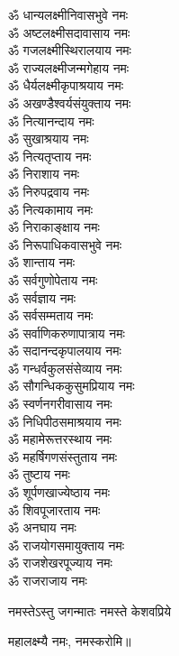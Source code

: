 \begin{multicols}{2}
\begin{flushleft}
ॐ धान्यलक्ष्मीनिवासभुवे नमः\\
ॐ अष्टलक्ष्मीसदावासाय नमः\\
ॐ गजलक्ष्मीस्थिरालयाय नमः\\
ॐ राज्यलक्ष्मीजन्मगेहाय नमः\hfill{}\\ %
ॐ धैर्यलक्ष्मीकृपाश्रयाय नमः\\
ॐ अखण्डैश्वर्यसंयुक्ताय नमः\\
ॐ नित्यानन्दाय नमः\\
ॐ सुखाश्रयाय नमः\\
ॐ नित्यतृप्ताय नमः\\
ॐ निराशाय नमः\\
ॐ निरुपद्रवाय नमः\\
ॐ नित्यकामाय नमः\\
ॐ निराकाङ्क्षाय नमः\\
ॐ निरूपाधिकवासभुवे नमः\hfill{}\\ %
ॐ शान्ताय नमः\\
ॐ सर्वगुणोपेताय नमः\\
ॐ सर्वज्ञाय नमः\\
ॐ सर्वसम्मताय नमः\\
ॐ सर्वाणिकरुणापात्राय नमः\\
ॐ सदानन्दकृपालयाय नमः\\
ॐ गन्धर्वकुलसंसेव्याय नमः\\
ॐ सौगन्धिककुसुमप्रियाय नमः\\
ॐ स्वर्णनगरीवासाय नमः\\
ॐ निधिपीठसमाश्रयाय नमः\hfill{}\\ %
ॐ महामेरूत्तरस्थाय नमः\\
ॐ महर्षिगणसंस्तुताय नमः\\
ॐ तुष्टाय नमः\\
ॐ शूर्पणखाज्येष्ठाय नमः\\
ॐ शिवपूजारताय नमः\\
ॐ अनघाय नमः\\
ॐ राजयोगसमायुक्ताय नमः\\
ॐ राजशेखरपूज्याय नमः\\
ॐ राजराजाय नमः\\ %
\end{flushleft}
\end{multicols}


{नमस्तेऽस्तु जगन्मातः नमस्ते केशवप्रिये}

महालक्ष्म्यै नमः, नमस्करोमि॥


